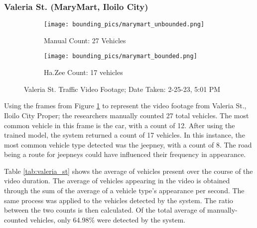 \subsubsection{Valeria St. (MaryMart, Iloilo City)}


\begin{figure}[!htbp]
	\begin{subfigure}{.5\textwidth}
		\centering
		\texttt{[image: bounding\_pics/marymart\_unbounded.png]}
		\caption{Manual Count: 27 Vehicles}
		
	\end{subfigure}%
	\begin{subfigure}{.5\textwidth}
		\centering
		\texttt{[image: bounding\_pics/marymart\_bounded.png]}
		\caption{Ha.Zee Count: 17 vehicles}
	\end{subfigure}
	\caption{Valeria St. Traffic Video Footage; Date Taken: 2-25-23, 5:01 PM}
	\label{fig:valeria}
\end{figure}
\FloatBarrier

Using the frames from Figure \ref{fig:valeria} to represent the video footage from Valeria St., Iloilo City Proper; the researchers manually counted 27 total vehicles. The most common vehicle in this frame is the car, with a count of 12. After using the trained model, the system returned a count of 17 vehicles. In this instance, the most common vehicle type detected was the jeepney, with a count of 8. The road being a route for jeepneys could have influenced their frequency in appearance.

Table \ref{tab:valeria_st} shows the average of vehicles present over the course of the video duration. The average of vehicles appearing in the video is obtained through the sum of the average of a vehicle type’s appearance per second. The same process was applied to the vehicles detected by the system. The ratio between the two counts is then calculated. Of the total average of manually-counted vehicles, only 64.98\% were detected by the system. 



